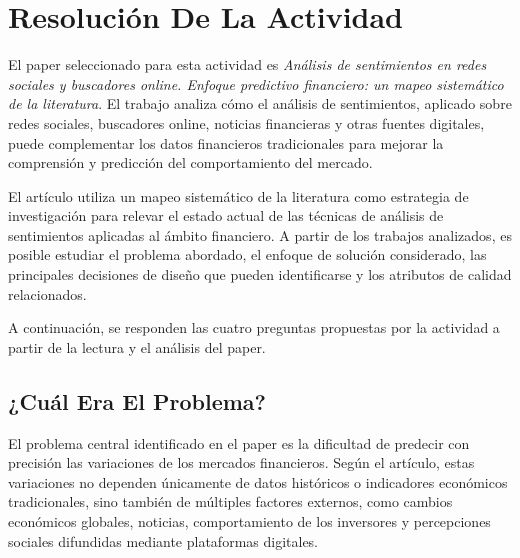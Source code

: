 
\section{Resolución De La Actividad}
\vspace{2mm}

El paper seleccionado para esta actividad es \textit{Análisis de sentimientos en redes sociales y buscadores online. Enfoque predictivo financiero: un mapeo sistemático de la literatura}. El trabajo analiza cómo el análisis de sentimientos, aplicado sobre redes sociales, buscadores online, noticias financieras y otras fuentes digitales, puede complementar los datos financieros tradicionales para mejorar la comprensión y predicción del comportamiento del mercado.

\vspace{2mm}

El artículo utiliza un mapeo sistemático de la literatura como estrategia de investigación para relevar el estado actual de las técnicas de análisis de sentimientos aplicadas al ámbito financiero. A partir de los trabajos analizados, es posible estudiar el problema abordado, el enfoque de solución considerado, las principales decisiones de diseño que pueden identificarse y los atributos de calidad relacionados.

\vspace{2mm}

A continuación, se responden las cuatro preguntas propuestas por la actividad a partir de la lectura y el análisis del paper.


\subsection{¿Cuál Era El Problema?}
\vspace{2mm}

El problema central identificado en el paper es la dificultad de predecir con precisión las variaciones de los mercados financieros. Según el artículo, estas variaciones no dependen únicamente de datos históricos o indicadores económicos tradicionales, sino también de múltiples factores externos, como cambios económicos globales, noticias, comportamiento de los inversores y percepciones sociales difundidas mediante plataformas digitales.

\vspace{2mm}

